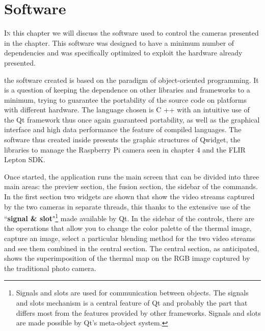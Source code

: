 \chapter{Software}
\label{chap:software}
\lettrine[lines=3]{I}{n} this chapter we will discuss the software used to
control the cameras presented in the chapter. This software was designed to have
a minimum number of dependencies and was specifically optimized to exploit the
hardware already presented.


%
the software created is based on the paradigm of object-oriented programming. It
is a question of keeping the dependence on other libraries and frameworks to a
minimum, trying to guarantee the portability of the source code on platforms
with different hardware. The language chosen is C ++ with an intuitive use of
the Qt framework thus once again guaranteed portability, as well as the
graphical interface and high data performance the feature of compiled languages.
The software thus created inside presents the graphic structures of Qwidget, the
libraries to manage the Raspberry Pi camera seen in chapter 4 and the FLIR
Lepton SDK.

Once started, the application runs the main screen that can be divided into
three main areas: the preview section, the fusion section, the sidebar of the
commands. In the first section two widgets are shown that show the video streams
captured by the two cameras in separate threads, this thanks to the extensive
use of the ``\textbf{signal \& slot}"\footnote{Signals and slots are used for
communication between objects. The signals and slots mechanism is a central
feature of Qt and probably the part that differs most from the features provided
by other frameworks. Signals and slots are made possible by Qt's meta-object
system.\cite{qtsignalslot}} made available by Qt. In the sidebar of the
controls, there are the operations that allow you to change the color palette of
the thermal image, capture an image, select a particular blending method for the
two video streams and see them combined in the central section. The central
section, as anticipated, shows the superimposition of the thermal map on the RGB
image captured by the traditional photo camera.



